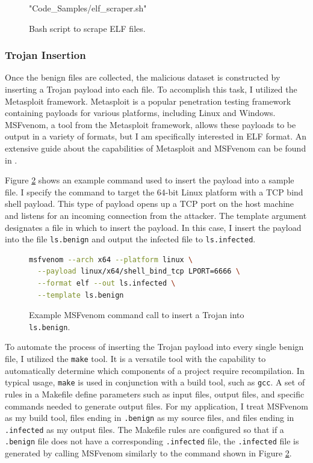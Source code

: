 \documentclass[12pt, letterpaper, titlepage]{article}
\newcommand{\figRef}[1]{Figure \ref{#1}}
\newcommand{\metasploit}{Metasploit}
\newcommand{\msfv}{MSFvenom}
\newcommand{\payloadName}{TCP bind shell}
\begin{document}
\begin{figure}[H]
  \centering
  
  {"Code_Samples/elf_scraper.sh"}
  \caption{Bash script to scrape ELF files.}
  \label{fig:ElfScraper}
\end{figure}

\subsubsection{Trojan Insertion}
Once the benign files are collected, the malicious dataset is constructed by inserting a Trojan payload into each file.
To accomplish this task, I utilized the \metasploit{} \cite{Metasploit} framework.
\metasploit{} is a popular penetration testing framework containing payloads for various platforms, including Linux and Windows.
\msfv{}, a tool from the \metasploit{} framework, allows these payloads to be output in a variety of formats, but I am specifically interested in ELF format.
An extensive guide about the capabilities of \metasploit{} and \msfv{} can be found in \cite{MetasploitUnleashed}.

\figRef{fig:MsfCmd} shows an example command used to insert the payload into a sample file.
I specify the command to target the 64-bit Linux platform with a \payloadName{} payload.
This type of payload opens up a TCP port on the host machine and listens for an incoming connection from the attacker.
The template argument designates a file in which to insert the payload.
In this case, I insert the payload into the file \verb|ls.benign| and output the infected file to \verb|ls.infected|.

\begin{figure}[H]
  \centering
  \begin{lstlisting}[language=bash]
msfvenom --arch x64 --platform linux \
  --payload linux/x64/shell_bind_tcp LPORT=6666 \
  --format elf --out ls.infected \
  --template ls.benign
  \end{lstlisting}
\cprotect\caption{Example \msfv{} command call to insert a Trojan into \verb|ls.benign|.}
  \label{fig:MsfCmd}
\end{figure}

To automate the process of inserting the Trojan payload into every single benign file, I utilized the \verb|make| tool\cite{make}.
It is a versatile tool with the capability to automatically determine which components of a project require recompilation.
In typical usage, \verb|make| is used in conjunction with a build tool, such as \verb|gcc|.
A set of rules in a Makefile define parameters such as input files, output files, and specific commands needed to generate output files.
For my application, I treat \msfv{} as my build tool, files ending in \verb|.benign| as my source files, and files ending in \verb|.infected| as my output files.
The Makefile rules are configured so that if a \verb|.benign| file does not have a corresponding \verb|.infected| file, the \verb|.infected| file is generated by calling \msfv{} similarly to the command shown in \figRef{fig:MsfCmd}.
\end{document}

